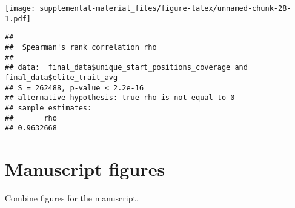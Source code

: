 \documentclass[]{book}
\newenvironment{Shaded}{\begin{snugshade}}{\end{snugshade}}
\newcommand{\DataTypeTok}[1]{\textcolor[rgb]{0.13,0.29,0.53}{#1}}
\newcommand{\KeywordTok}[1]{\textcolor[rgb]{0.13,0.29,0.53}{\textbf{#1}}}
\newcommand{\NormalTok}[1]{#1}
\newcommand{\OperatorTok}[1]{\textcolor[rgb]{0.81,0.36,0.00}{\textbf{#1}}}
\newcommand{\OtherTok}[1]{\textcolor[rgb]{0.56,0.35,0.01}{#1}}
\newcommand{\StringTok}[1]{\textcolor[rgb]{0.31,0.60,0.02}{#1}}
\begin{document}
\texttt{[image: supplemental-material\_files/figure-latex/unnamed-chunk-28-1.pdf]}

\begin{Shaded}
\end{Shaded}

\begin{verbatim}
## 
##  Spearman's rank correlation rho
## 
## data:  final_data$unique_start_positions_coverage and final_data$elite_trait_avg
## S = 262488, p-value < 2.2e-16
## alternative hypothesis: true rho is not equal to 0
## sample estimates:
##       rho 
## 0.9632668
\end{verbatim}

\hypertarget{manuscript-figures-1}{%
\section{Manuscript figures}\label{manuscript-figures-1}}

Combine figures for the manuscript.
\end{document}
